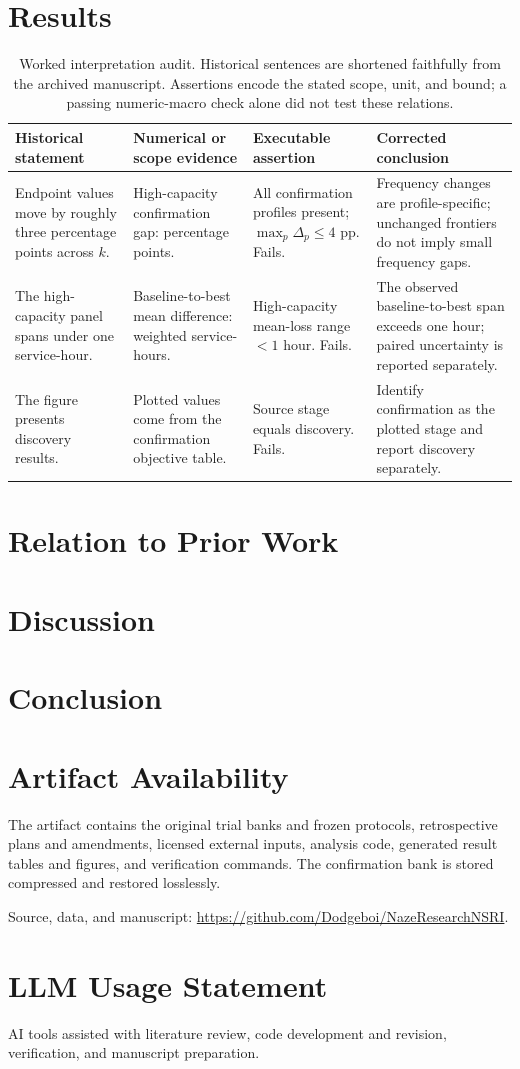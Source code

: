 \documentclass[conference,compsoc]{IEEEtran}
\newif\ifanonymous
\begin{document}
\section{Results}

\begin{table}[t]
\centering\small
\caption{Worked interpretation audit. Historical sentences are shortened
faithfully from the archived manuscript. Assertions encode the stated scope,
unit, and bound; a passing numeric-macro check alone did not test these relations.}
\label{tab:worked}
\begin{tabularx}{\textwidth}{@{}*{4}{>{\raggedright\arraybackslash}X}@{}}\toprule
Historical statement & Numerical or scope evidence & Executable assertion & Corrected conclusion\\\midrule
Endpoint values move by roughly three percentage points across $k$.
& High-capacity confirmation gap: \HighGap{} percentage points.
& All confirmation profiles present; $\max_p\Delta_p\leq4$ pp. Fails.
& Frequency changes are profile-specific; unchanged frontiers do not imply small frequency gaps.\\
The high-capacity panel spans under one service-hour.
& Baseline-to-best mean difference: \HighSaving{} weighted service-hours.
& High-capacity mean-loss range $<1$ hour. Fails.
& The observed baseline-to-best span exceeds one hour; paired uncertainty is reported separately.\\
The figure presents discovery results.
& Plotted values come from the confirmation objective table.
& Source stage equals discovery. Fails.
& Identify confirmation as the plotted stage and report discovery separately.\\\bottomrule
\end{tabularx}
\end{table}
\section{Relation to Prior Work}

\section{Discussion}

\section{Conclusion}


\section*{Artifact Availability}
The artifact contains the original trial banks and frozen protocols,
retrospective plans and amendments, licensed external inputs, analysis code,
generated result tables and figures, and verification commands. The
confirmation bank is stored compressed and restored losslessly.
\ifanonymous
The identified repository link is omitted from this review copy.
\else
Source, data, and manuscript:
\url{https://github.com/Dodgeboi/NazeResearchNSRI}.
\fi




\section*{LLM Usage Statement}
AI tools assisted with literature review, code development and revision,
verification, and manuscript preparation.

\appendices

\end{document}
